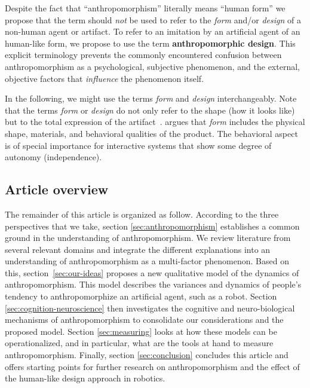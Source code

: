 \documentclass{frontiersSCNS} %
\begin{document}
Despite the fact that ``anthropomorphism'' literally means ``human form'' we
propose that the term should \textit{not} be used to refer to the \emph{form}
and/or \emph{design} of a non-human agent or artifact. To refer to an imitation
by an artificial agent of an human-like form, we propose to use the term
\textbf{anthropomorphic design}. This explicit terminology prevents the commonly
encountered confusion between anthropomorphism as a psychological, subjective
phenomenon, and the external, objective factors that \emph{influence} the
phenomenon itself.

In the following, we might use the terms \emph{form} and \emph{design}
interchangeably. Note that the terms \textit{form} or {\it design} do not only
refer to the shape (how it looks like) but to the total expression of the
artifact~\citep{bartneck_shaping_2004}. \citet{disalvo_hug:_2003} argues that
\textit{form} includes the physical shape, materials, and behavioral qualities
of the product. The behavioral aspect is of special importance for interactive
systems that show some degree of autonomy (independence).

\subsection{Article overview}

The remainder of this article is organized as follow.  According to the three
perspectives that we take, section \ref{sec:anthropomorphism} establishes a
common ground in the understanding of anthropomorphism. We review literature
from several relevant domains and integrate the different explanations into an
understanding of anthropomorphism as a multi-factor phenomenon.  Based on this,
section~\ref{sec:our-ideas} proposes a new qualitative model of the dynamics of
anthropomorphism. This model describes the variances and dynamics of people's
tendency to anthropomorphize an artificial agent, such as a robot. Section
\ref{sec:cognition-neuroscience} then investigates the cognitive and
neuro-biological mechanisms of anthropomorphism to consolidate our
considerations and the proposed model.  Section \ref{sec:measuring} looks at how
these models can be operationalized, and in particular, what are the tools at
hand to measure anthropomorphism. Finally, section \ref{sec:conclusion}
concludes this article and offers starting points for further research on
anthropomorphism and the effect of the human-like design approach in robotics.


%
%
%
%
%
%
\end{document}
